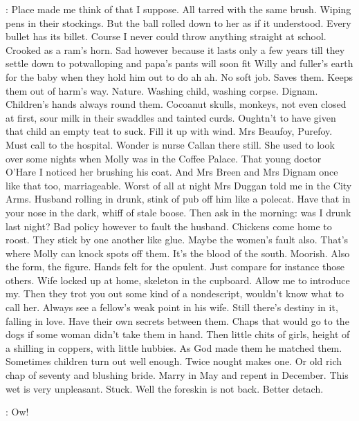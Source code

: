 \Bloom:
Place made me think of that I suppose. All tarred with the same brush.
Wiping pens in their stockings. But the ball rolled down to her as if it
understood. Every bullet has its billet. Course I never could throw
anything straight at school. Crooked as a ram's horn. Sad however because
it lasts only a few years till they settle down to potwalloping and papa's
pants will soon fit Willy and fuller's earth for the baby when they hold
him out to do ah ah. No soft job. Saves them. Keeps them out of harm's
way. Nature. Washing child, washing corpse. Dignam. Children's hands
always round them. Cocoanut skulls, monkeys, not even closed at first,
sour milk in their swaddles and tainted curds. Oughtn't to have given
that child an empty teat to suck. Fill it up with wind. Mrs Beaufoy,
Purefoy. Must call to the hospital. Wonder is nurse Callan there still.
She used to look over some nights when Molly was in the Coffee Palace.
That young doctor O'Hare I noticed her brushing his coat. And Mrs Breen
and Mrs Dignam once like that too, marriageable. Worst of all at night
Mrs Duggan told me in the City Arms. Husband rolling in drunk, stink of
pub off him like a polecat. Have that in your nose in the dark,
whiff of stale boose. Then ask in the morning: was I drunk last
night? Bad policy however to fault the husband. Chickens come
home to roost. They stick by one another like glue. Maybe the
women's fault also. That's where Molly can knock spots off them. It's the
blood of the south. Moorish. Also the form, the figure. Hands felt for the
opulent. Just compare for instance those others. Wife locked up at home,
skeleton in the cupboard. Allow me to introduce my. Then they trot you out
some kind of a nondescript, wouldn't know what to call her. Always see a
fellow's weak point in his wife. Still there's destiny in it, falling in
love. Have their own secrets between them. Chaps that would go to the dogs
if some woman didn't take them in hand. Then little chits of girls,
height of a shilling in coppers, with little hubbies. As God made them he
matched them. Sometimes children turn out well enough. Twice nought makes
one. Or old rich chap of seventy and blushing bride. Marry in May and
repent in December. This wet is very unpleasant. Stuck. Well the foreskin
is not back. Better detach.

\Bloom:
Ow!

